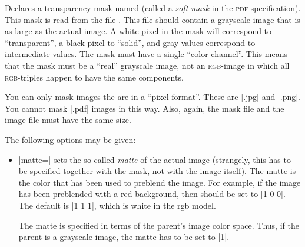 \begin{command}{\pgfdeclaremask{}}
    Declares a transparency mask named  (called a \emph{soft
    mask} in the \textsc{pdf} specification). This mask is read from the file
    . This file should contain a grayscale image that is as
    large as the actual image. A white pixel in the mask will correspond to
    ``transparent'', a black pixel to ``solid'', and gray values correspond to
    intermediate values. The mask must have a single ``color channel''. This
    means that the mask must be a ``real'' grayscale image, not an
    \textsc{rgb}-image in which all \textsc{rgb}-triples happen to have the
    same components.

    You can only mask images the are in a ``pixel format''. These are |.jpg|
    and |.png|. You cannot mask |.pdf| images in this way. Also, again, the
    mask file and the image file must have the same size.

    The following options may be given:
    \begin{itemize}
        \item |matte=| sets the so-called \emph{matte}
            of the actual image (strangely, this has to be specified together
            with the mask, not with the image itself). The matte is the color
            that has been used to preblend the image. For example, if the image
            has been preblended with a red background, then  should be set to |{1 0 0}|. The default is |{1 1 1}|,
            which is white in the rgb model.

            The matte is specified in terms of the parent's image color space.
            Thus, if the parent is a grayscale image, the matte has to be set
            to |{1}|.
    \end{itemize}
    \example
\begin{codeexample}[]
\hbox{\hskip-14cm\hskip1cm
\hskip1cm
\hskip1cm
}
\end{codeexample}
\end{command}


